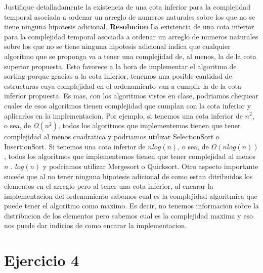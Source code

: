 \documentclass[10pt,a4paper]{article}
\begin{document}
Justifique detalladamente la existencia de una cota inferior para la complejidad temporal asociada a ordenar un arreglo de numeros naturales sobre los que no se tiene ninguna hipotesis adicional.
\newline
\newline
\textbf{Resolucion}
\newline
\newline
La existencia de una cota inferior para la complejidad temporal asociada a ordenar un arreglo de numeros naturales sobre los que no se tiene ninguna hipotesis adicional indica que cualquier algoritmo que se proponga va a tener una complejidad de, al menos, la de la cota superior propuesta.  
\newline
\newline
Esto favorece a la hora de implementar el algoritmo de sorting porque gracias a la cota inferior, tenemos una posible cantidad de estructuras cuya complejidad en el ordenamiento van a cumplir la de la cota inferior propuesta. Es mas, con los algoritmos vistos en clase, podriamos chequear cuales de esos algoritmos tienen complejidad que cumplan con la cota inferior y aplicarlos en la implementacion. Por ejemplo, si tenemos una cota inferior de $n^{2}$, o sea, de $\Omega(n^{2})$, todos los algoritmos que implementemos tienen que tener complejidad al menos cuadratica y podriamos utilizar SelectionSort o InsertionSort. Si tenemos una cota inferior de $n log(n)$, o sea, de $\Omega(n log(n))$, todos los algoritmos que implementemos tienen que tener complejidad al menos $n$ . $log(n)$ y podriamos utilizar Mergesort o Quicksort.    
\newline
\newline
Otro aspecto importante sucede que al no tener ninguna hipotesis adicional de como estan ditribuidos los elementos en el arreglo pero al tener una cota inferior, al encarar la implementacion del ordenamiento sabemos cual es la complejidad algoritmica que puede tener el algoritmo como maximo. Es decir, no tenemos informacion sobre la distribucion de los elementos pero sabemos cual es la complejidad maxima y eso nos puede dar indicios de como encarar la implementacion.

\newpage

\section{Ejercicio 4}
\end{document}

